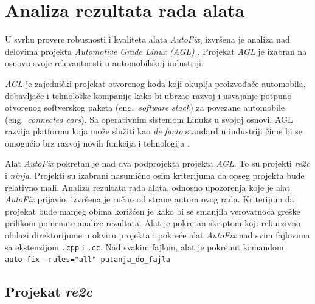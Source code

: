 \documentclass[12pt,oneside]{memoir}
\begin{document}
\section{Analiza rezultata rada alata}

U svrhu provere robusnosti i kvaliteta alata \textit{AutoFix}, izvr\v{s}ena je analiza nad delovima projekta \textit{Automotive Grade Linux (AGL)} \cite{AGL}. Projekat \textit{AGL} je izabran na osnovu svoje relevantnosti u automobilskoj industriji. \par

\textit{AGL} je zajedni\v{c}ki projekat otvorenog koda koji okuplja proizvođa\v{c}e automobila, dobavlja\v{c}e i tehnolo\v{s}ke kompanije kako bi ubrzao razvoj i usvajanje potpuno otvorenog softverskog paketa (eng.~\textit{software stack}) za povezane automobile (eng.~\textit{connected cars}). Sa operativnim sistemom Linuks u svojoj osnovi, AGL razvija platformu koja mo\v{z}e slu\v{z}iti kao \textit{de facto} standard u industriji \v{c}ime bi se omogu\'{c}io brz razvoj novih funkcija i tehnologija \cite{AGL}.
\par
Alat \textit{AutoFix} pokretan je nad dva podprojekta projekta \textit{AGL}. To su projekti \textit{re2c} i \textit{ninja}. Projekti su izabrani nasumi\v{c}no osim kriterijuma
da opseg projekta bude relativno mali. Analiza rezultata rada alata, odnosno upozorenja koje je alat \textit{AutoFix} prijavio, izvr\v{s}ena je ru\v{c}no od strane autora ovog rada. Kriterijum da projekat bude manjeg obima kori\v{s}\'{c}en je kako bi se smanjila verovatno\'{c}a gre\v{s}ke prilikom pomenute analize rezultata. Alat je pokretan skriptom koji rekurzivno 
obilazi direktorijume u okviru projekta i pokre\'{c}e alat \textit{AutoFix} nad  svim fajlovima sa ekstenzijom \texttt{.cpp} i \texttt{.cc}. Nad svakim fajlom, alat je pokrenut komandom \\
\texttt{auto-fix  --rules="all"  putanja\_do\_fajla }

\subsection{Projekat \textit{re2c}}
\end{document}

